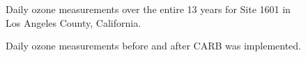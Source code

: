 \documentclass{article}
\begin{document}
\begin{figure}[h]

\caption{\label{fig:max_all1}Daily ozone measurements over the entire 13 years for Site 1601 in Los Angeles County, California.}
\end{figure}



\begin{figure}[h]

\caption{\label{fig:max_doy1}Daily ozone measurements before and after CARB was implemented.}
\end{figure}
\end{document}
